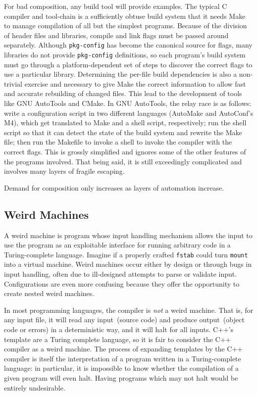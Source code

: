 \documentclass[letterpaper,twocolumn,10pt]{article}
\begin{document}
For bad composition, any build tool will provide examples. The typical C compiler and tool-chain is a sufficiently obtuse build system that it needs Make to manage compilation of all but the simplest programs. Because of the division of header files and libraries, compile and link flags must be passed around separately. Although \texttt{pkg-config} has become the canonical source for flags, many libraries do not provide \texttt{pkg-config} definitions, so each program's build system must go through a platform-dependent set of steps to discover the correct flags to use a particular library. Determining the per-file build dependencies is also a non-trivial exercise and necessary to give Make the correct information to allow fast and accurate rebuilding of changed files. This lead to the development of tools like GNU AutoTools and CMake. In GNU AutoTools, the relay race is as follows: write a configuration script in two different languages (AutoMake and AutoConf's M4), which get translated to Make and a shell script, respectively; run the shell script so that it can detect the state of the build system and rewrite the Make file; then run the Makefile to invoke a shell to invoke the compiler with the correct flags. This is grossly simplified and ignores some of the other features of the programs involved. That being said, it is still exceedingly complicated and involves many layers of fragile escaping.

Demand for composition only increases as layers of automation increase.

\subsection{Weird Machines}
A weird machine is program whose input handling mechanism allows the input to use the program as an exploitable interface for running arbitrary code in a Turing-complete language. Imagine if a properly crafted \texttt{fstab} could turn \texttt{mount} into a virtual machine. Weird machines occur either by design or through bugs in input handling, often due to ill-designed attempts to parse or validate input\cite{weird}. Configurations are even more confusing because they offer the opportunity to create nested weird machines.

In most programming languages, the compiler is \emph{not} a weird machine. That is, for any input file, it will read any input~(source code) and produce output~(object code or errors) in a deterministic way, and it will halt for all inputs. C++'s template are a Turing complete language, so it is fair to consider the C++ compiler as a weird machine. The process of expanding templates by the C++ compiler is itself the interpretation of a program written in a Turing-complete language: in particular, it is impossible to know whether the compilation of a given program will even halt. Having programs which may not halt would be entirely undesirable.
\end{document}
